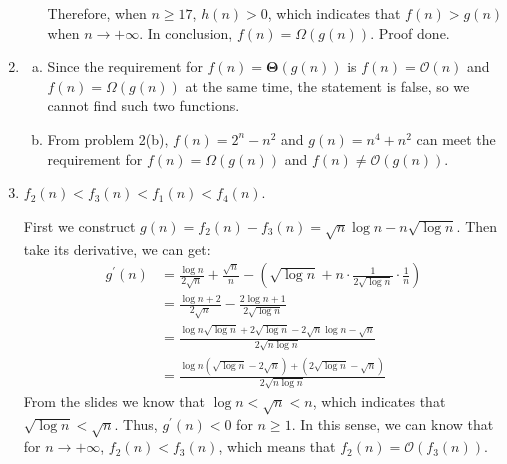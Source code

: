 \documentclass[12pt, a4paper]{article}
\begin{document}
\begin{enumerate}
\begin{enumerate}
              Therefore, when $n \geq 17$, $h(n) > 0$, which indicates that $f(n) > g(n)$ when $n \rightarrow +\infty$. 
              In conclusion, $f(n) = \Omega(g(n))$. Proof done.
    \end{enumerate}

    \item \begin{enumerate}[a)]
        \item Since the requirement for $f(n) = \boldsymbol{\Theta}(g(n))$ is $f(n) = \mathcal{O}(n)$ and $f(n) = \Omega(g(n))$ at the same time, 
              the statement is false, so we cannot find such two functions.
              
        \item From problem 2(b), 
              $f(n) = 2^n - n^2$ and $g(n) = n^4 + n^2$ can meet the requirement for $f(n) = \Omega(g(n))$ and $f(n) \neq \mathcal{O}(g(n))$.
    \end{enumerate}

    \item $f_2(n) < f_3(n) < f_1(n) < f_4(n)$.
          
          First we construct $g(n) = f_2(n) - f_3(n) = \sqrt{n}\log n - n\sqrt{\log n}$. Then take its derivative, we can get:
          \begin{align*}
              g^\prime(n) &= \frac{\log n}{2\sqrt{n}} + \frac{\sqrt{n}}{n} - (\sqrt{\log n} + n\cdot \frac{1}{2\sqrt{\log n}}\cdot \frac{1}{n})\\
                          &= \frac{\log n + 2}{2\sqrt{n}} - \frac{2\log n + 1}{2\sqrt{\log n}}\\
                          &= \frac{\log n \sqrt{\log n} + 2\sqrt{\log n} - 2\sqrt{n}\log n - \sqrt{n}}{2\sqrt{n\log n}}\\
                          &= \frac{\log n(\sqrt{\log n} - 2\sqrt{n}) + (2\sqrt{\log n} - \sqrt{n})}{2\sqrt{n\log n}}
          \end{align*}
          From the slides we know that $\log n < \sqrt{n} < n$, which indicates that $\sqrt{\log n} < \sqrt{n}$. 
          Thus, $g^\prime(n) < 0$ for $n \geq 1$. In this sense, we can know that for $n \rightarrow +\infty$, $f_2(n) < f_3(n)$, 
          which means that $f_2(n) = \mathcal{O}(f_3(n))$.


\end{enumerate}
\end{document}
